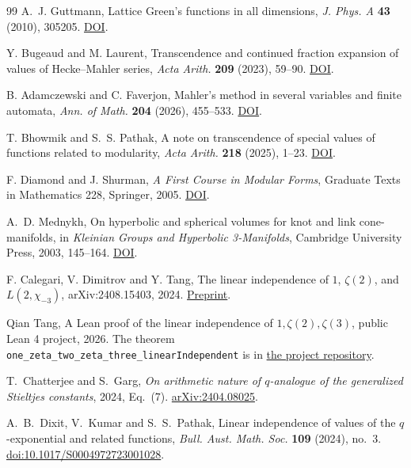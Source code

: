 \documentclass[11pt,a4paper]{article}
\theoremstyle{definition}
\theoremstyle{remark}
\begin{document}
\begin{thebibliography}{99}
 A.~J. Guttmann, Lattice Green's functions in all dimensions,
\emph{J. Phys. A} \textbf{43} (2010), 305205.
\href{https://doi.org/10.1088/1751-8113/43/30/305205}{DOI}.

 Y. Bugeaud and M. Laurent,
Transcendence and continued fraction expansion of values of Hecke--Mahler series,
\emph{Acta Arith.} \textbf{209} (2023), 59--90.
\href{https://doi.org/10.4064/aa220323-18-1}{DOI}.

 B. Adamczewski and C. Faverjon, Mahler's method in several variables and
finite automata, \emph{Ann. of Math.} \textbf{204} (2026), 455--533.
\href{https://doi.org/10.4007/annals.2026.204.2.1}{DOI}.

 T. Bhowmik and S.~S. Pathak, A note on transcendence of special values
of functions related to modularity, \emph{Acta Arith.} \textbf{218} (2025), 1--23.
\href{https://doi.org/10.4064/aa240128-7-9}{DOI}.

 F. Diamond and J. Shurman, \emph{A First Course in Modular Forms},
Graduate Texts in Mathematics 228, Springer, 2005.
\href{https://doi.org/10.1007/978-0-387-27226-9}{DOI}.

 A.~D. Mednykh, On hyperbolic and spherical volumes for knot and link
cone-manifolds, in \emph{Kleinian Groups and Hyperbolic 3-Manifolds}, Cambridge
University Press, 2003, 145--164.
\href{https://doi.org/10.1017/CBO9780511542817.008}{DOI}.

 F. Calegari, V. Dimitrov and Y. Tang,
The linear independence of $1$, $\zeta(2)$, and $L(2,\chi_{-3})$,
arXiv:2408.15403, 2024. \href{https://arxiv.org/abs/2408.15403}{Preprint}.

 Qian Tang, A Lean proof of the linear independence of
$1,\zeta(2),\zeta(3)$, public Lean 4 project, 2026. The theorem
\texttt{one\_zeta\_two\_zeta\_three\_linearIndependent} is in
\href{https://github.com/dtq1997/zeta2-zeta3-linear-independence}{the project repository}.

 T.~Chatterjee and S.~Garg, \emph{On arithmetic nature of
$q$-analogue of the generalized Stieltjes constants}, 2024, Eq.~(7).
\href{https://arxiv.org/abs/2404.08025}{arXiv:2404.08025}.

 A.~B.~Dixit, V.~Kumar and S.~S.~Pathak,
Linear independence of values of the $q$-exponential and related functions,
\emph{Bull. Aust. Math. Soc.} \textbf{109} (2024), no.~3.
\href{https://doi.org/10.1017/S0004972723001028}{doi:10.1017/S0004972723001028}.


\end{thebibliography}
\end{document}
